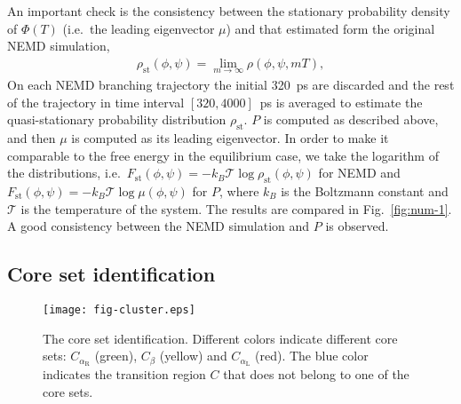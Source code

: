 \documentclass[journal=jctcce,manuscript=article]{achemso}
\newcommand{\mymu}{\mu}
\newcommand{\dih}{\textrm{dih}}
\newcommand{\confaa}[0]{{\alpha_{\textrm{R}}}}
\newcommand{\confc}[0]{{\alpha_{\textrm{L}}}}
\begin{document}
An important check is the consistency between the
stationary probability density of $\Phi(T)$ (i.e.~the leading eigenvector $\mymu$) and that 
estimated form the original NEMD simulation,
\begin{align}
  \label{eq:num-tmp1}
  \rho_{\textrm{st}}(\phi,\psi) = \lim_{m\rightarrow\infty} \rho (\phi,\psi,mT),
\end{align}
On each NEMD branching trajectory the initial 320~ps are discarded and
the rest of the trajectory in time interval $[320,4000]$~ps is averaged to estimate
the quasi-stationary probability distribution $\rho_{\textrm{st}}$. 
$P$ is computed as described above, and then $\mymu$ is computed as its leading eigenvector. In order to make it comparable to the free energy in the equilibrium case, we take
the logarithm of the distributions, i.e.~$F_{\textrm{st}}(\phi,\psi)=
-k_B\mathcal T\log \rho_{\textrm{st}}(\phi,\psi)$
for NEMD and $F_{\textrm{st}}(\phi,\psi)=
-k_B\mathcal T\log \mu(\phi,\psi)$ for $P$, where $k_B$ is the
Boltzmann constant and $\mathcal T$ is the temperature of the system.
The
results are  compared in Fig.~\ref{fig:num-1}. A good consistency between
the  NEMD simulation and 
$P$ is observed.  


\subsection{Core set identification}

\begin{figure}
  \centering
  \texttt{[image: fig-cluster.eps]}
  \caption{The core set identification. Different colors indicate different core sets: $C_{\confaa}$ (green), $C_\beta$ (yellow) and $C_{\confc}$ (red).
    The blue color indicates the transition region $C$ that does not belong to one of the core sets.}
  \label{fig:cluster}
\end{figure}
\end{document}
